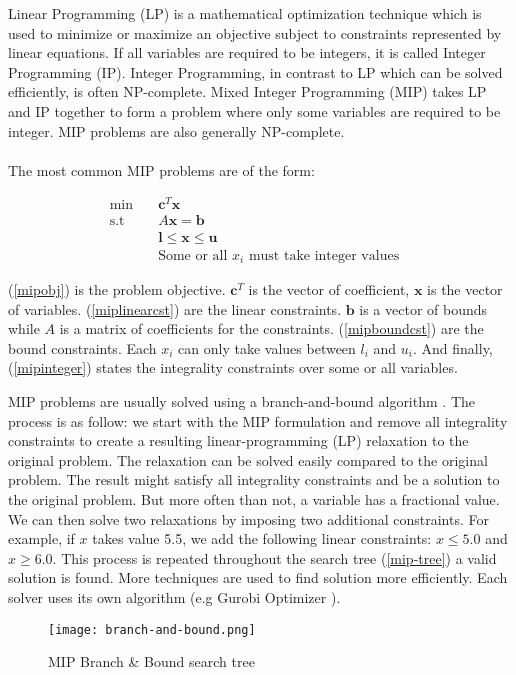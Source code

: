 \documentclass[../../thesis.tex]{subfiles}
\begin{document}
Linear Programming (LP) is a mathematical optimization technique which is used to minimize or maximize 
an objective subject to constraints represented by linear equations. 
If all variables are required to be integers, it is called Integer Programming (IP). 
Integer Programming, in contrast to LP which can be solved efficiently, is often NP-complete.  
Mixed Integer Programming (MIP) takes LP and IP together to form a problem where only some variables 
are required to be integer. MIP problems are also generally NP-complete.

\paragraph{}

The most common MIP problems are of the form:

\begin{align}
  \textrm{min} \quad & \bm{c}^T\bm{x} & \label{mipobj} \\ 
  \textrm{s.t} \quad & A\bm{x} = \bm{b} & \label{miplinearcst} \\
   & \bm{l} \leq \bm{x} \leq \bm{u} & \label{mipboundcst} \\
   & \text{Some or all $x_i$ must take integer values} \label{mipinteger}
\end{align}

(\ref{mipobj}) is the problem objective. $\bm{c}^T$ is the vector of coefficient, $\bm{x}$ is the vector of variables.
(\ref{miplinearcst}) are the linear constraints. $\bm{b}$ is a vector of bounds while $A$ is a matrix of coefficients for the constraints.
(\ref{mipboundcst}) are the bound constraints. Each $x_i$ can only take values between $l_i$ and $u_i$.
And finally, (\ref{mipinteger}) states the integrality constraints over some or all variables.


MIP problems are usually solved using a branch-and-bound algorithm \cite{mip-basics}.
The process is as follow: we start with the MIP formulation and remove all integrality constraints 
to create a resulting linear-programming (LP) relaxation to the original problem. The relaxation can be solved 
easily compared to the original problem. The result might satisfy all integrality constraints and be a solution to the original problem.
But more often than not, a variable has a fractional value.
We can then solve two relaxations by imposing two additional constraints. For example, if $x$ takes value 5.5, we add the 
following linear constraints: $x \leq 5.0$ and $x \geq 6.0$. 
This process is repeated throughout the search tree (\autoref{mip-tree}) a valid solution is found.
More techniques are used to find solution more efficiently. Each solver uses its
own algorithm (e.g Gurobi Optimizer \cite{mip-basics}).

\begin{figure}
  \centering
  \texttt{[image: branch-and-bound.png]}
  \caption{MIP Branch \& Bound search tree \cite{mip-basics}}
  \label{mip-tree}
\end{figure}
\end{document}
